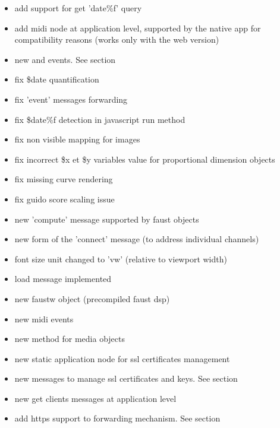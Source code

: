 \begin{itemize}
\item add support for get 'date\%f' query
\item add midi node at application level, supported by the native app for compatibility reasons (works only with the web version)
\item new  and  events. See section 
\item fix \$date quantification
\item fix 'event' messages forwarding
\item fix \$date\%f detection in javascript run method
\item fix non visible mapping for images
\item fix incorrect \$x et \$y variables value for proportional dimension objects
\item fix missing curve rendering
\item fix guido score scaling issue
\end{itemize}

\inscoreweb
\begin{itemize}
\item new 'compute' message supported by faust objects
\item new form of the 'connect' message (to address individual channels)
\item font size unit changed to 'vw' (relative to viewport width)
\item load message implemented
\item new faustw object (precompiled faust dsp)
\item new midi events
\end{itemize}


\begin{itemize}
\item new  method for media objects
\item new  static application node for ssl certificates management
\item new    messages to manage ssl certificates and keys. See section 
\item new get clients messages at application level
\item add https support to forwarding mechanism. See section 
\end{itemize}

